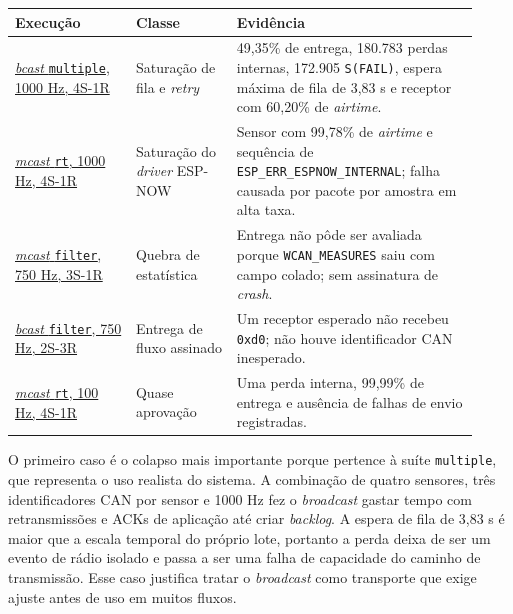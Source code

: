 \begin{center}
\scriptsize
\setlength{\tabcolsep}{3pt}
\renewcommand{\arraystretch}{1.12}
\begin{tabular}{p{0.24\linewidth}|p{0.20\linewidth}|p{0.48\linewidth}}
\hline
Execução & Classe & Evidência \\
\hline
\href{https://github.com/cirillom/WCAN/tree/thesis-final/transmitter/testing/results/final/broadcast/multiple/1000Hz/test_4S-1R_rep0}{\emph{bcast} \texttt{multiple}, 1000 Hz, 4S-1R} & Saturação de fila e \emph{retry} & 49,35\% de entrega, 180.783 perdas internas, 172.905 \texttt{S(FAIL)}, espera máxima de fila de 3,83 s e receptor com 60,20\% de \emph{airtime}. \\
\hline
\href{https://github.com/cirillom/WCAN/tree/thesis-final/transmitter/testing/results/final/multicast/real_time/1000Hz/test_4S-1R_rep1}{\emph{mcast} \texttt{rt}, 1000 Hz, 4S-1R} & Saturação do \emph{driver} ESP-NOW & Sensor com 99,78\% de \emph{airtime} e sequência de \texttt{ESP\_ERR\_ESPNOW\_INTERNAL}; falha causada por pacote por amostra em alta taxa. \\
\hline
\href{https://github.com/cirillom/WCAN/tree/thesis-final/transmitter/testing/results/final/multicast/active_filter/750Hz/test_3S-1R_rep0}{\emph{mcast} \texttt{filter}, 750 Hz, 3S-1R} & Quebra de estatística & Entrega não pôde ser avaliada porque \texttt{WCAN\_MEASURES} saiu com campo colado; sem assinatura de \emph{crash}. \\
\hline
\href{https://github.com/cirillom/WCAN/tree/thesis-final/transmitter/testing/results/final/broadcast/active_filter/750Hz/test_2S-3R_rep0}{\emph{bcast} \texttt{filter}, 750 Hz, 2S-3R} & Entrega de fluxo assinado & Um receptor esperado não recebeu \texttt{0xd0}; não houve identificador CAN inesperado. \\
\hline
\href{https://github.com/cirillom/WCAN/tree/thesis-final/transmitter/testing/results/final/multicast/real_time/100Hz/test_4S-1R_rep1}{\emph{mcast} \texttt{rt}, 100 Hz, 4S-1R} & Quase aprovação & Uma perda interna, 99,99\% de entrega e ausência de falhas de envio registradas. \\
\hline
\end{tabular}
\label{tab:falhas-representativas-final}
\end{center}

O primeiro caso é o colapso mais importante porque pertence à suíte
\texttt{multiple}, que representa o uso realista do sistema. A combinação de
quatro sensores, três identificadores CAN por sensor e 1000 Hz fez o \emph{broadcast} gastar tempo
com retransmissões e ACKs de aplicação até criar \emph{backlog}. A espera de fila de
3,83 s é maior que a escala temporal do próprio lote, portanto a perda deixa de
ser um evento de rádio isolado e passa a ser uma falha de capacidade do caminho
de transmissão. Esse caso justifica tratar o \emph{broadcast} como transporte que exige
ajuste antes de uso em muitos fluxos.


